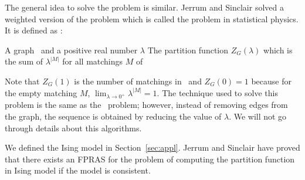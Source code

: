 The general idea to solve the  problem is similar. Jerrum and Sinclair \cite{Jerrum96}
solved a weighted version of the  problem which is called the 
problem in statistical physics. It is defined as :

{A graph \mG\ and a positive real number \(\lambda\)}
{The partition function \(Z_G(\lambda)\) which is the sum of
\(\lambda^{|M|}\) for all matchings \(M\) of \mG}

Note that \(Z_G(1)\) is the number of matchings in \mG\ and \(Z_G(0)=1\) because
for the empty matching \(M\), \(\lim_{\lambda\to 0^+}\lambda^{|M|}=1\). The technique used to
solve this problem is the same as the \ldkcol\ problem; however, instead of removing edges from
the graph, the sequence is obtained by reducing the value of \(\lambda\)\@. We will not 
go through details about this algorithms.

We defined the Ising model in Section~\ref{sec:appl}\@. 
Jerrum and Sinclair \cite{Jer93} have proved that there exists an FPRAS for the
problem of computing the partition function in Ising model if the model 
is consistent.

\begin{comment}
Consider a Markov chain with each state representing a solution of the problem.
The transitions are to the same solution with probability of \(\frac{1}{2}\) 
and to a similar solution with probability \(\frac{1}{2}\).

There is usually a sequence of instances (the length of sequence is polynomial) such that
the first element of the sequence is the instance  that we are trying to solve
and the last element is a trivial instance.
The ratio of answers between two consecutive elements 
is estimated by sampling along a random walk.
The final answer is the product of the ratios and the answer for trivial instance. 

In order for Markov chain Monte-Carlo to work, the chain must be ergodic and rapidly mixing.
Mixing time is the minimum length of a random walk such that the required
quantity is measured with desired approximation and if mixing
time is polynomial then the chain is said to be rapidly mixing.

The \pname{\#Match} problem is solved as follows.
A suitable sequence \(\bl\) of real numbers beginning with one and ending
with zero is chosen. The ratios \(Z_G(\bl_i)/Z_G(\bl_{i+1})\) are estimated 
by sampling along a random walk on the Markov chain. \(Z_G(1)\) is the product of
all the ratios.

The \ldkcol\ problem is solved as follows. Let \mG\ be a graph with \mn\ vertices
and \mm\ edges. Let \(\bG\) be a sequence of subgraphs of \mG\ where
\(\bG_0=G\) and \(\bG_{i+1}\) is obtained from \(\bG_i\) by removing a single edge. 
The last element \(\bG_m\) is an empty graph which is k-colorable in \(k^n\) ways.
The ratio \(Z(G_i)/Z(G_{i+1})\) is estimated
by sampling along a random walk on the Markov chain. \(Z(G)\) is the product of all the
ratios and the number of k-colorings of \(\bG_m\).
\end{comment}

